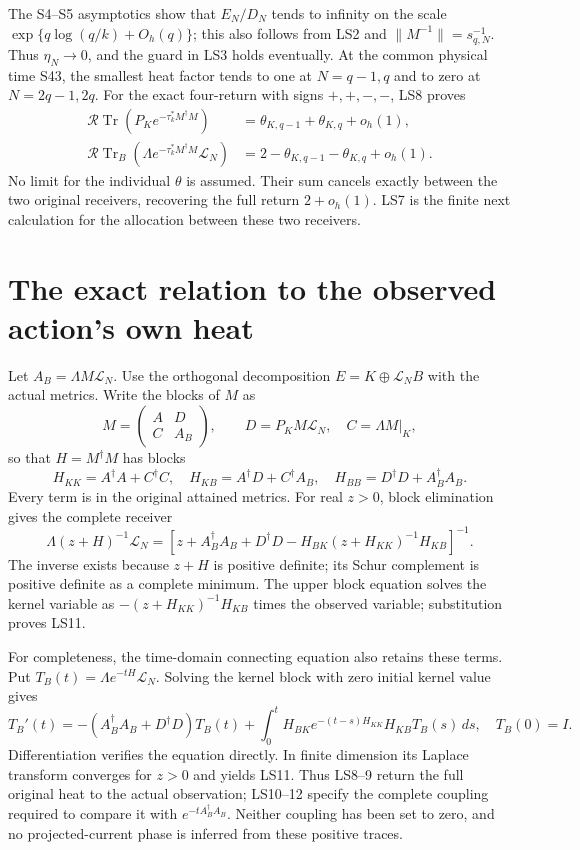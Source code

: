 \documentclass[11pt]{article}
\newcommand{\Tr}{\operatorname{Tr}}
\newcommand{\norm}[1]{\lVert#1\rVert}
\begin{document}
The S4--S5 asymptotics show that $E_N/D_N$ tends to infinity
on the scale $\exp\{q\log(q/k)+O_h(q)\}$; this also follows
from LS2 and $\norm{M^{-1}}=s_{q,N}^{-1}$.
Thus $\eta_N\to0$, and the guard in LS3 holds eventually.
At the common physical time S43, the smallest heat factor tends
to one at $N=q-1,q$ and to zero at $N=2q-1,2q$.
For the exact four-return with signs $+,+,-,-$, LS8 proves
\[
\boxed{\begin{aligned}
\mathcal R\Tr(P_K e^{-\tau_k^*M^\dagger M})
 &=\theta_{K,q-1}+\theta_{K,q}+o_h(1),\\
\mathcal R\Tr_B(\Lambda e^{-\tau_k^*M^\dagger M}\mathcal L_N)
 &=2-\theta_{K,q-1}-\theta_{K,q}+o_h(1).
\end{aligned}}\tag{LS9}
\]
No limit for the individual $\theta$ is assumed. Their sum
cancels exactly between the two original receivers, recovering
the full return $2+o_h(1)$. LS7 is the finite next calculation
for the allocation between these two receivers.

\section{The exact relation to the observed action's own heat}
Let $A_B=\Lambda M\mathcal L_N$. Use the orthogonal decomposition
$E=K\oplus\mathcal L_NB$ with the actual metrics. Write the blocks
of $M$ as
\[
M=\begin{pmatrix}A&D\\ C&A_B\end{pmatrix},\qquad
D=P_KM\mathcal L_N,\quad C=\Lambda M|_K,
\]
so that $H=M^\dagger M$ has blocks
\[
H_{KK}=A^\dagger A+C^\dagger C,\quad
H_{KB}=A^\dagger D+C^\dagger A_B,\quad
H_{BB}=D^\dagger D+A_B^\dagger A_B.
\tag{LS10}
\]
Every term is in the original attained metrics.
For real $z>0$, block elimination gives the complete receiver
\[
\boxed{\Lambda(z+H)^{-1}\mathcal L_N
=\left[z+A_B^\dagger A_B+D^\dagger D
-H_{BK}(z+H_{KK})^{-1}H_{KB}\right]^{-1}.}
\tag{LS11}
\]
The inverse exists because $z+H$ is positive definite; its
Schur complement is positive definite as a complete minimum.
The upper block equation solves the kernel variable as
$-(z+H_{KK})^{-1}H_{KB}$ times the observed variable;
substitution proves LS11.

For completeness, the time-domain connecting equation also retains
these terms. Put $T_B(t)=\Lambda e^{-tH}\mathcal L_N$.
Solving the kernel block with zero initial kernel value gives
\[
\boxed{T_B'(t)=-(A_B^\dagger A_B+D^\dagger D)T_B(t)
+\int_0^tH_{BK}e^{-(t-s)H_{KK}}H_{KB}T_B(s)\,ds,\quad T_B(0)=I.}
\tag{LS12}
\]
Differentiation verifies the equation directly. In finite dimension
its Laplace transform converges for $z>0$ and yields LS11.
Thus LS8--9 return the full original heat to the actual observation;
LS10--12 specify the complete coupling required to compare it with
$e^{-tA_B^\dagger A_B}$. Neither coupling has been set to zero,
and no projected-current phase is inferred from these positive traces.
\end{document}
